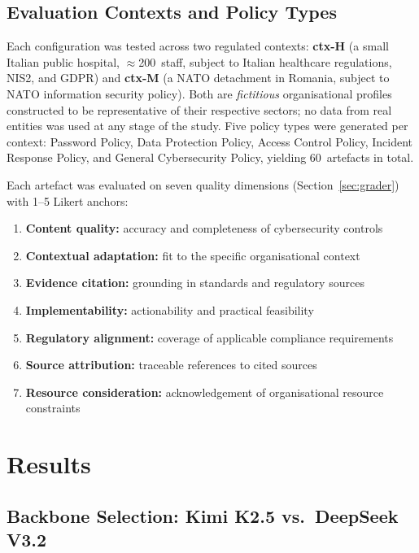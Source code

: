 \documentclass[runningheads]{llncs}
\begin{document}
\subsection{Evaluation Contexts and Policy Types}
\label{sec:rubric}

Each configuration was tested across two regulated contexts:
\textbf{ctx-H} (a small Italian public hospital, $\approx$200~staff,
subject to Italian healthcare regulations, NIS2, and GDPR) and
\textbf{ctx-M} (a NATO detachment in Romania, subject to NATO information
security policy). Both are \emph{fictitious} organisational profiles
constructed to be representative of their respective sectors; no data from
real entities was used at any stage of the study.
Five policy types were generated per context: Password
Policy, Data Protection Policy, Access Control Policy, Incident Response
Policy, and General Cybersecurity Policy, yielding 60~artefacts in total.

Each artefact was evaluated on seven quality dimensions
(Section~\ref{sec:grader}) with 1--5 Likert anchors:

\begin{enumerate}
  \item \textbf{Content quality:} accuracy and completeness of
        cybersecurity controls
  \item \textbf{Contextual adaptation:} fit to the specific
        organisational context
  \item \textbf{Evidence citation:} grounding in standards and
        regulatory sources
  \item \textbf{Implementability:} actionability and practical
        feasibility
  \item \textbf{Regulatory alignment:} coverage of applicable
        compliance requirements
  \item \textbf{Source attribution:} traceable references to cited
        sources
  \item \textbf{Resource consideration:} acknowledgement of
        organisational resource constraints
\end{enumerate}


\section{Results}

\subsection{Backbone Selection: Kimi K2.5 vs.\ DeepSeek V3.2}
\label{sec:backbone}
\end{document}

